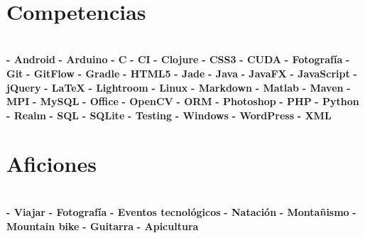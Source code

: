 \documentclass[]{friggeri-cv}
\begin{document}
\begin{aside}
~
~
~
  \section{\vspace{0.49cm}Competencias}
    \\[0.3cm]
    \textbf{- Android}
    \textbf{- Arduino}
    \textbf{- C}
    \textbf{- CI}    
    \textbf{- Clojure}
    \textbf{- CSS3}
    \textbf{- CUDA}
    \textbf{- Fotografía}
    \textbf{- Git}
    \textbf{- GitFlow}    
    \textbf{- Gradle}
    \textbf{- HTML5}
    \textbf{- Jade}
    \textbf{- Java}
    \textbf{- JavaFX}
    \textbf{- JavaScript}
    \textbf{- jQuery}
    \textbf{- \LaTeX}
    \textbf{- Lightroom}
    \textbf{- Linux}
    \textbf{- Markdown}
    \textbf{- Matlab}
    \textbf{- Maven}
    \textbf{- MPI}
    \textbf{- MySQL}
    \textbf{- Office}
    \textbf{- OpenCV}
    \textbf{- ORM}
    \textbf{- Photoshop}
    \textbf{- PHP}
    \textbf{- Python}
    \textbf{- Realm}
    \textbf{- SQL}
    \textbf{- SQLite}    
    \textbf{- Testing}
    \textbf{- Windows}
    \textbf{- WordPress}
    \textbf{- XML}
    ~
  \section{Aficiones}
    \\[0.3cm]
    \textbf{- Viajar}
    \textbf{- Fotografía}
    \textbf{- Eventos tecnológicos}
    \textbf{- Natación}
    \textbf{- Montañismo}
    \textbf{- Mountain bike}    
    \textbf{- Guitarra} 
    \textbf{- Apicultura}
    ~
\end{aside}
\end{document}
